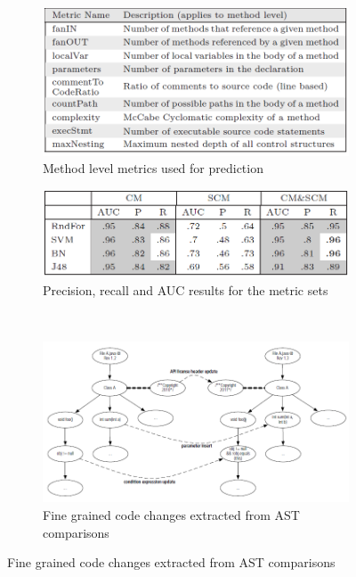  \begin{figure}[H]
     \begin{subfigure}{.5\textwidth}
         \centering
         \includegraphics[scale=0.3]{./src/method_prediction_metrics.png}
         \caption{Method level metrics used for prediction}\label{method_prediction:metrics}
     \end{subfigure}%
     \begin{subfigure}{.5\textwidth}
         \centering
         \includegraphics[scale=0.4]{./src/method_prediction_results.png}
         \caption{Precision, recall and AUC results for the metric sets}\label{method_prediction:results}
     \end{subfigure}\\
     \begin{subfigure}{\textwidth}
         \centering
         \includegraphics[scale=0.4]{./src/method_prediction_ast.png}
         \caption{Fine grained code changes extracted from AST comparisons}\label{method_prediction:ast}
     \end{subfigure}  
 \end{figure}


